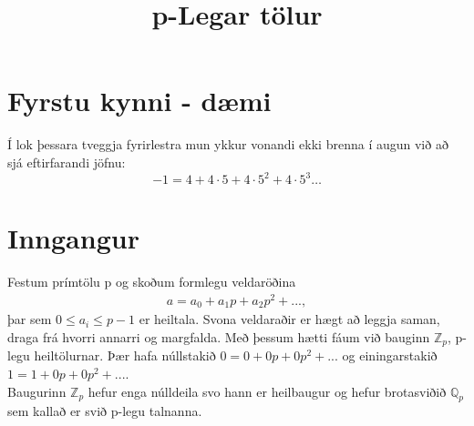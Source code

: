 

\title{p-Legar tölur}

\maketitle
\section*{Fyrstu kynni - dæmi}
Í lok þessara tveggja fyrirlestra mun ykkur vonandi ekki brenna í augun við að sjá eftirfarandi jöfnu:
\begin{equation*}
-1 = 4 + 4\cdot 5+4\cdot 5^2+4\cdot 5^3 \ldots
\end{equation*}

\section*{Inngangur}
Festum prímtölu p og skoðum formlegu veldaröðina
\begin{align*}
a = a_0 + a_1 p + a_2 p^2 + ...,
\end{align*}
þar sem $0 \leq a_i \leq p-1$ er heiltala. 
Svona veldaraðir er hægt að leggja saman, draga frá hvorri annarri
 og margfalda.
Með þessum hætti fáum við bauginn $\mathbb{Z}_p$, p-legu heiltölurnar.
Þær hafa núllstakið $0 = 0+0p+0p^2+...$ og 
einingarstakið $1 = 1 + 0p+0p^2+...$.
\\Baugurinn $\mathbb{Z}_p$ hefur enga núlldeila svo hann er heilbaugur 
og hefur brotasviðið $\mathbb{Q}_p$ sem kallað er svið p-legu talnanna.

